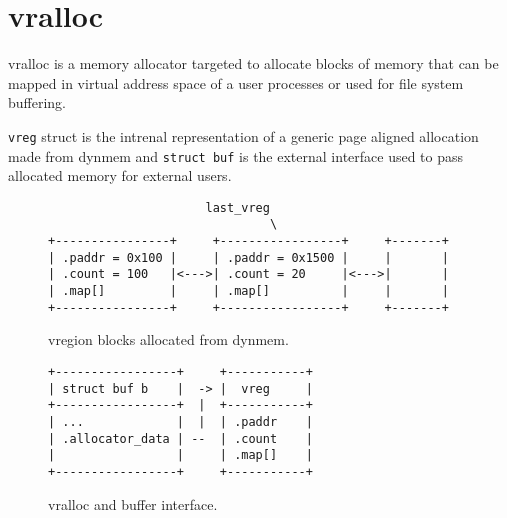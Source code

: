 \chapter{vralloc}

\acf{vralloc} is a memory allocator targeted to allocate blocks of memory
that can be mapped in virtual address space of a user processes or used for
file system buffering.

\verb+vreg+ struct is the intrenal representation of a generic page aligned
allocation made from dynmem and \verb+struct buf+ is the external interface
used to pass allocated memory for external users.

\begin{figure}
\begin{verbatim}
                      last_vreg
                               \
+----------------+     +-----------------+     +-------+
| .paddr = 0x100 |     | .paddr = 0x1500 |     |       |
| .count = 100   |<--->| .count = 20     |<--->|       |
| .map[]         |     | .map[]          |     |       |
+----------------+     +-----------------+     +-------+
\end{verbatim}
\caption{vregion blocks allocated from dynmem.}
\label{figure:vralloc_blocks}
\end{figure}

\begin{figure}
\begin{verbatim}
+-----------------+     +-----------+
| struct buf b    |  -> |  vreg     |
+-----------------+  |  +-----------+
| ...             |  |  | .paddr    |
| .allocator_data | --  | .count    |
|                 |     | .map[]    |
+-----------------+     +-----------+
\end{verbatim}
\caption{vralloc and buffer interface.}
\label{figure:vrregbufapi}
\end{figure}
